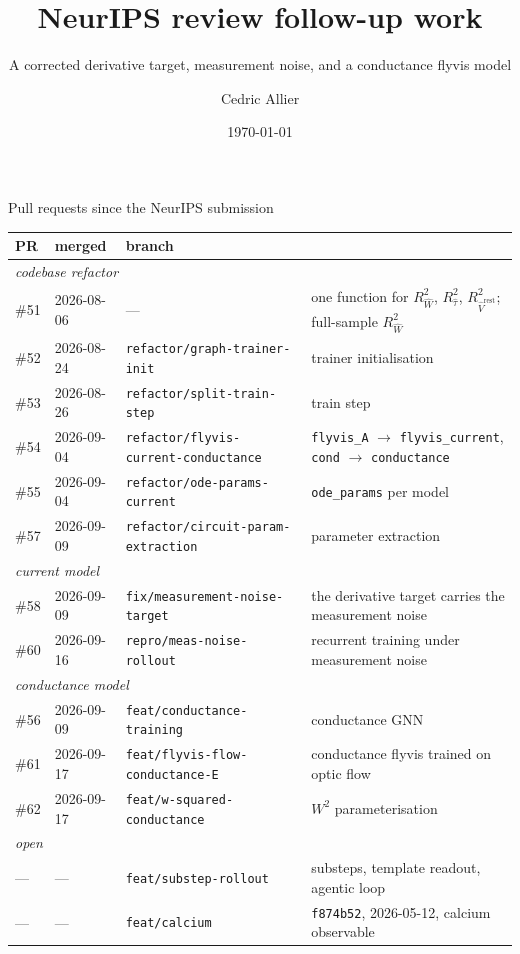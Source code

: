 \documentclass[aspectratio=169]{beamer}
\title{NeurIPS review follow-up work}
\subtitle{A corrected derivative target, measurement noise, and a conductance flyvis model}
\author{Cedric Allier}
\institute{Saalfeld lab, Janelia}
\date{\today}
\begin{document}
\frame{\titlepage}

\begin{frame}{Pull requests since the NeurIPS submission}
\vspace*{0.2cm}
\centering\tiny
\setlength{\tabcolsep}{5pt}
\begin{tabular}{llll}
\toprule
PR & merged & branch & \\
\midrule
\multicolumn{4}{l}{\itshape codebase refactor} \\
\#51 & 2026-08-06 & \multicolumn{1}{l}{---}
  & one function for $R^2_{\hat W}$, $R^2_{\hat\tau}$, $R^2_{\hat V^{\mathrm{rest}}}$;
    full-sample $R^2_{\hat W}$ \\
\#52 & 2026-08-24 & \texttt{refactor/graph-trainer-init} & trainer initialisation \\
\#53 & 2026-08-26 & \texttt{refactor/split-train-step} & train step \\
\#54 & 2026-09-04 & \texttt{refactor/flyvis-current-conductance}
  & \texttt{flyvis\_A} $\rightarrow$ \texttt{flyvis\_current}, \texttt{cond} $\rightarrow$ \texttt{conductance} \\
\#55 & 2026-09-04 & \texttt{refactor/ode-params-current} & \texttt{ode\_params} per model \\
\#57 & 2026-09-09 & \texttt{refactor/circuit-param-extraction} & parameter extraction \\
\midrule
\multicolumn{4}{l}{\itshape current model} \\
\#58 & 2026-09-09 & \texttt{fix/measurement-noise-target}
  & the derivative target carries the measurement noise \\
\#60 & 2026-09-16 & \texttt{repro/meas-noise-rollout} & recurrent training under measurement noise \\
\midrule
\multicolumn{4}{l}{\itshape conductance model} \\
\#56 & 2026-09-09 & \texttt{feat/conductance-training} & conductance GNN \\
\#61 & 2026-09-17 & \texttt{feat/flyvis-flow-conductance-E}
  & conductance flyvis trained on optic flow \\
\#62 & 2026-09-17 & \texttt{feat/w-squared-conductance} & $W^2$ parameterisation \\
\midrule
\multicolumn{4}{l}{\itshape open} \\
\multicolumn{1}{l}{---} & \multicolumn{1}{l}{---} & \texttt{feat/substep-rollout}
  & substeps, template readout, agentic loop \\
\multicolumn{1}{l}{---} & \multicolumn{1}{l}{---} & \texttt{feat/calcium}
  & \texttt{f874b52}, 2026-05-12, calcium observable \\
\bottomrule
\end{tabular}
\end{frame}
\end{document}
